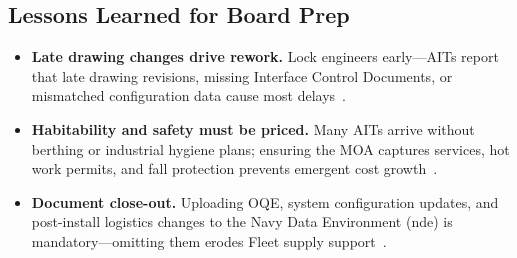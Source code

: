 \documentclass[../main.tex]{subfiles}
\begin{document}
\subsection{Lessons Learned for Board Prep}
\begin{itemize}
\item \textbf{Late drawing changes drive rework.} Lock engineers early—AITs report that late drawing revisions, missing Interface Control Documents, or mismatched configuration data cause most delays~\autocite{edo-4-1-4-ait-fundamentals-2025}.
\item \textbf{Habitability and safety must be priced.} Many AITs arrive without berthing or industrial hygiene plans; ensuring the MOA captures services, hot work permits, and fall protection prevents emergent cost growth~\autocite{SL720-AA-MAN-030}.
\item \textbf{Document close-out.} Uploading OQE, system configuration updates, and post-install logistics changes to the Navy Data Environment (\ac{nde}) is mandatory—omitting them erodes Fleet supply support~\autocite{TS9090-310}.
\end{itemize}

\end{document}
